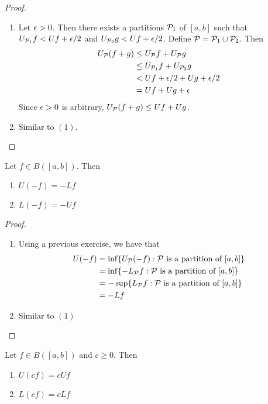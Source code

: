\documentclass{book}
\begin{document}
	\begin{proof}\
		\begin{enumerate}
			\item Let $\epsilon >0$. Then there exists a partitions $\mathcal{P}_1$ of $[a,b]$ such that $U_{\mathcal{P}_1} f < U f + \epsilon/2$ and $U_{\mathcal{P}_2} g < U f + \epsilon/2$. Define $\mathcal{P} = \mathcal{P}_1 \cup \mathcal{P}_2$. Then 
			\begin{align*}
				U_{\mathcal{P}}(f +g) 
				&\leq U_{\mathcal{P}} f + U_{\mathcal{P}} g \\
				&\leq U_{\mathcal{P}_1} f + U_{\mathcal{P}_2} g \\
				&< U f + \epsilon/2 +  U g + \epsilon/2 \\
				&= Uf + Ug + \epsilon
			\end{align*}
			Since $\epsilon >0$ is arbitrary, $U_{\mathcal{P}}(f +g)  \leq Uf + Ug$.
			\item Similar to $(1)$.
		\end{enumerate}
	\end{proof}

	\begin{ex}  
		Let $f \in B([a,b])$. Then 
		\begin{enumerate}
			\item $U(-f) = -Lf$
			\item $L(-f) = -Uf$
		\end{enumerate}
	\end{ex}

	\begin{proof} \
		\begin{enumerate}
			\item Using a previous exercise, we have that
			\begin{align*}
				U(-f)
				&= \inf \{U_{\mathcal{P}}(-f): \mathcal{P} \text{ is a partition of } [a,b]\} \\
				&= \inf \{ -L_{\mathcal{P}} f: \mathcal{P} \text{ is a partition of } [a,b]\} \\
				&= - \sup \{L_{\mathcal{P}} f: \mathcal{P} \text{ is a partition of } [a,b]\} \\
				&= - Lf
			\end{align*}
			\item Similar to $(1)$
		\end{enumerate}
	\end{proof}

	\begin{ex}  
		Let $f \in B([a,b])$ and $c \geq 0$. Then 
		\begin{enumerate}
			\item $U (cf) = c U f$ 
			\item $L (cf) = c L f $
		\end{enumerate}
	\end{ex}
	
\end{document}
